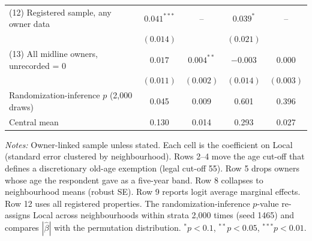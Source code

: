 \begin{table}[!htbp]
\begin{threeparttable}
\begin{tabular}{lcccc}
(12) Registered sample, any owner data & $0.041^{***}$ & -- & $0.039^{*}$ & -- \\
 & $(0.014)$ &  & $(0.021)$ &  \\
(13) All midline owners, unrecorded = 0 & $0.017$ & $0.004^{**}$ & $-0.003$ & $0.000$ \\
 & $(0.011)$ & $(0.002)$ & $(0.014)$ & $(0.003)$ \\
\midrule
Randomization-inference $p$ (2,000 draws) & 0.045 & 0.009 & 0.601 & 0.396 \\
Central mean & 0.130 & 0.014 & 0.293 & 0.027 \\
\bottomrule
\end{tabular}
\begin{tablenotes}[flushleft]\scriptsize
\item \textit{Notes:} Owner-linked sample unless stated. Each cell is the coefficient on Local (standard error clustered by neighbourhood). Rows 2--4 move the age cut-off that defines a discretionary old-age exemption (legal cut-off 55). Row 5 drops owners whose age the respondent gave as a five-year band. Row 8 collapses to neighbourhood means (robust SE). Row 9 reports logit average marginal effects. Row 12 uses all registered properties. The randomization-inference $p$-value re-assigns Local across neighbourhoods within strata 2,000 times (seed 1465) and compares $|\hat\beta|$ with the permutation distribution. $^{*}p<0.1$, $^{**}p<0.05$, $^{***}p<0.01$.
\end{tablenotes}
\end{threeparttable}
\end{table}